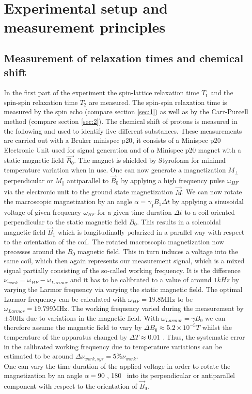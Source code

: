\section{Experimental setup and measurement principles}
\subsection{Measurement of relaxation times and chemical shift}
In the first part of the experiment the spin-lattice relaxation time $T_1$ and the spin-spin relaxation time $T_2$ are measured. The spin-spin relaxation time is measured by the spin echo (compare section \ref{sec:1}) as well as by the Carr-Purcell method (compare section \ref{sec:2}). The chemical shift of protons is measured in the following and used to identify five different substances. These measurements are carried out with a Bruker minispec p20, it consists of a Minispec p20 Electronic Unit used for signal generation and of a Minispec p20 magnet with a static magnetic field $\vec{B_0}$. The magnet is shielded by Styrofoam for minimal temperature variation when in use. One can now generate a magnetization $M_{\perp}$ perpendicular or  $M_{\parallel}$ antiparallel to $\vec{B}_0$ by applying a high frequency pulse $\omega_{HF}$ via the electronic unit to the ground state magnetization $\vec{M}$. We can now rotate the macroscopic magnetization by an angle $\alpha = \gamma_I B_1 \Delta t$ by applying a sinusoidal voltage of given frequency $\omega _{HF}$ for a given time duration $\Delta t$ to a coil oriented perpendicular to the static magnetic field $B_0$. This results in a solenoidal magnetic field $\vec{B}_1$ which is longitudinally polarized in a parallel way with respect to the orientation of the coil. The rotated macroscopic magnetization now precesses around the $B_0$ magnetic field. This in turn induces a voltage into the same coil, which then again represents our measurement signal, which is a mixed signal partially consisting of the so-called working frequency. It is the difference $\nu_{work}=\omega_{HF} - \omega_{Larmor}$ and it has to be calibrated to a value of around $1 kHz$ by varying the Larmor frequency via varying the static magnetic field. The optimal Larmor frequency can be calculated with $\omega_{HF} = 19.8 \mathrm{MHz}$ to be $\omega_{Larmor} = 19.799 \mathrm{MHz}$. The working frequency varied during the measurement by $\pm 50 \mathrm{Hz}$ due to variations in the magnetic field. With $\omega_{Larmor} = \gamma B_0$ we can therefore assume the magnetic field to vary by $\Delta B_0 \approx 5.2\times10^{-5} T$ whilst the temperature of the apparatus changed by $\Delta T \approx 0.01$ \textcelsius. Thus, the systematic error in the calibrated working frequency due to temperature variations can be estimated to be around $\Delta \nu_{work,sys} = 5 \% \nu_{work}$.\\
One can vary the time duration of the applied voltage in order to rotate the magnetization by an angle $\alpha = 90$ \textdegree, 180 \textdegree \, into its perpendicular or antiparallel component with respect to the orientation of $\vec{B} _0$.\cite{manual}


